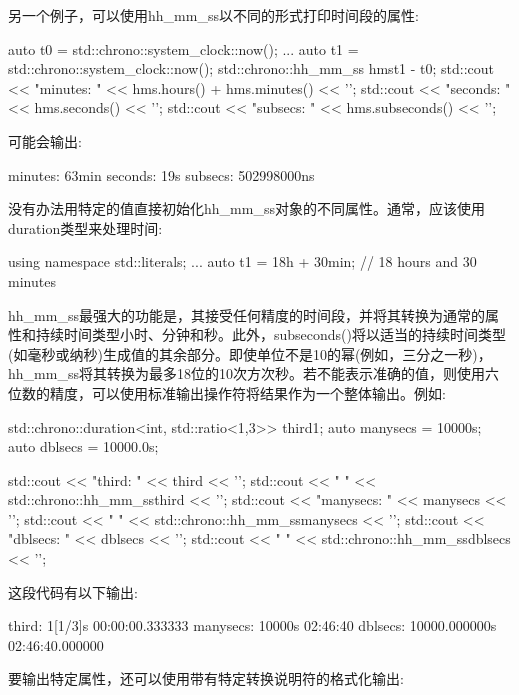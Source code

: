另一个例子，可以使用hh\_mm\_ss以不同的形式打印时间段的属性:

\begin{cpp}
auto t0 = std::chrono::system_clock::now();
...
auto t1 = std::chrono::system_clock::now();
std::chrono::hh_mm_ss hms{t1 - t0};
std::cout << "minutes: " << hms.hours() + hms.minutes() << '\n';
std::cout << "seconds: " << hms.seconds() << '\n';
std::cout << "subsecs: " << hms.subseconds() << '\n';
\end{cpp}

可能会输出:

\begin{shell}
minutes: 63min
seconds: 19s
subsecs: 502998000ns
\end{shell}

没有办法用特定的值直接初始化hh\_mm\_ss对象的不同属性。通常，应该使用duration类型来处理时间:

\begin{cpp}
using namespace std::literals;
...
auto t1 = 18h + 30min; // 18 hours and 30 minutes
\end{cpp}

hh\_mm\_ss最强大的功能是，其接受任何精度的时间段，并将其转换为通常的属性和持续时间类型小时、分钟和秒。此外，subseconds()将以适当的持续时间类型(如毫秒或纳秒)生成值的其余部分。即使单位不是10的幂(例如，三分之一秒)，hh\_mm\_ss将其转换为最多18位的10次方次秒。若不能表示准确的值，则使用六位数的精度，可以使用标准输出操作符将结果作为一个整体输出。例如:

\begin{cpp}
std::chrono::duration<int, std::ratio<1,3>> third{1};
auto manysecs = 10000s;
auto dblsecs = 10000.0s;

std::cout << "third: " << third << '\n';
std::cout << " " << std::chrono::hh_mm_ss{third} << '\n';
std::cout << "manysecs: " << manysecs << '\n';
std::cout << " " << std::chrono::hh_mm_ss{manysecs} << '\n';
std::cout << "dblsecs: " << dblsecs << '\n';
std::cout << " " << std::chrono::hh_mm_ss{dblsecs} << '\n';
\end{cpp}

这段代码有以下输出:

\begin{shell}
third:    1[1/3]s
          00:00:00.333333
manysecs: 10000s
          02:46:40
dblsecs:  10000.000000s
          02:46:40.000000
\end{shell}

要输出特定属性，还可以使用带有特定转换说明符的格式化输出:


